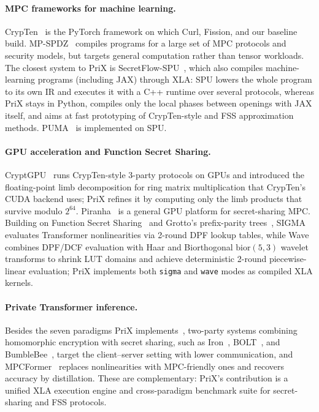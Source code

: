 \documentclass[11pt]{article}
\begin{document}
\paragraph{MPC frameworks for machine learning.} CrypTen~\cite{knott2021crypten} is the PyTorch framework on which Curl, Fission, and our baseline build. MP-SPDZ~\cite{keller2020mpspdz} compiles programs for a large set of MPC protocols and security models, but targets general computation rather than tensor workloads. The closest system to PriX is SecretFlow-SPU~\cite{ma2023spu}, which also compiles machine-learning programs (including JAX) through XLA: SPU lowers the whole program to its own IR and executes it with a C++ runtime over several protocols, whereas PriX stays in Python, compiles only the local phases between openings with JAX itself, and aims at fast prototyping of CrypTen-style and FSS approximation methods. PUMA~\cite{dong2023puma} is implemented on SPU.

\paragraph{GPU acceleration and Function Secret Sharing.} CryptGPU~\cite{tan2021cryptgpu} runs CrypTen-style 3-party protocols on GPUs and introduced the floating-point limb decomposition for ring matrix multiplication that CrypTen's CUDA backend uses; PriX refines it by computing only the limb products that survive modulo $2^{64}$. Piranha~\cite{watson2022piranha} is a general GPU platform for secret-sharing MPC. Building on Function Secret Sharing~\cite{boyle2015function,boyle2016function} and Grotto's prefix-parity trees~\cite{storrier2023grotto}, SIGMA~\cite{gupta2024sigma} evaluates Transformer nonlinearities via 2-round DPF lookup tables, while Wave~\cite{reis2025wave} combines DPF/DCF evaluation with Haar and Biorthogonal $\text{bior}(5,3)$ wavelet transforms to shrink LUT domains and achieve deterministic 2-round piecewise-linear evaluation; PriX implements both \texttt{sigma} and \texttt{wave} modes as compiled XLA kernels.

\paragraph{Private Transformer inference.} Besides the seven paradigms PriX implements~\cite{knott2021crypten,dong2023puma,pang2024bolt,li2024nimbus,kei2025shaft,santos2024curl,gupta2024sigma,reis2025wave,ugurbil2025fission}, two-party systems combining homomorphic encryption with secret sharing, such as Iron~\cite{hao2022iron}, BOLT~\cite{pang2024bolt}, and BumbleBee~\cite{lu2025bumblebee}, target the client--server setting with lower communication, and MPCFormer~\cite{li2023mpcformer} replaces nonlinearities with MPC-friendly ones and recovers accuracy by distillation. These are complementary: PriX's contribution is a unified XLA execution engine and cross-paradigm benchmark suite for secret-sharing and FSS protocols.
\end{document}
